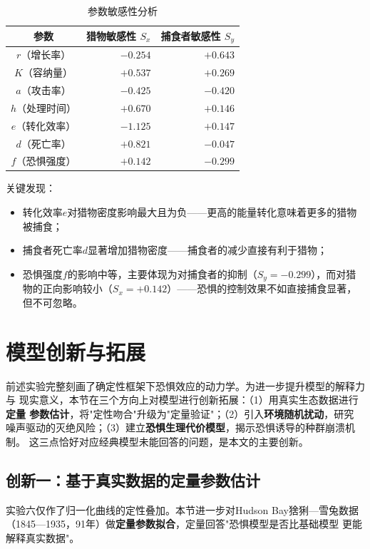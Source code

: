 \documentclass[UTF8]{ctexart}
\begin{document}
\begin{table}[H]
\centering
\caption{参数敏感性分析}
\label{tab:sensitivity}
\begin{tabular}{c|r|r}
\hline
\textbf{参数} & \textbf{猎物敏感性 $S_x$} & \textbf{捕食者敏感性 $S_y$} \\
\hline
$r$（增长率）    & $-0.254$ & $+0.643$ \\
$K$（容纳量）    & $+0.537$ & $+0.269$ \\
$a$（攻击率）    & $-0.425$ & $-0.420$ \\
$h$（处理时间）  & $+0.670$ & $+0.146$ \\
$e$（转化效率）  & $-1.125$ & $+0.147$ \\
$d$（死亡率）    & $+0.821$ & $-0.047$ \\
$f$（恐惧强度）  & $+0.142$ & $-0.299$ \\
\hline
\end{tabular}
\end{table}

关键发现：
\begin{itemize}
    \item 转化效率$e$对猎物密度影响最大且为负——更高的能量转化意味着更多的猎物被捕食；
    \item 捕食者死亡率$d$显著增加猎物密度——捕食者的减少直接有利于猎物；
    \item 恐惧强度$f$的影响中等，主要体现为对捕食者的抑制（$S_y = -0.299$），而对猎物的正向影响较小（$S_x = +0.142$）——恐惧的控制效果不如直接捕食显著，但不可忽略。
\end{itemize}

\section{模型创新与拓展}

前述实验完整刻画了确定性框架下恐惧效应的动力学。为进一步提升模型的解释力与
现实意义，本节在三个方向上对模型进行创新拓展：（1）用真实生态数据进行\textbf{定量
参数估计}，将"定性吻合"升级为"定量验证"；（2）引入\textbf{环境随机扰动}，研究
噪声驱动的灭绝风险；（3）建立\textbf{恐惧生理代价模型}，揭示恐惧诱导的种群崩溃机制。
这三点恰好对应经典模型未能回答的问题，是本文的主要创新。

\subsection{创新一：基于真实数据的定量参数估计}

实验六仅作了归一化曲线的定性叠加。本节进一步对Hudson Bay猞猁—雪兔数据
（1845—1935，91年）做\textbf{定量参数拟合}，定量回答"恐惧模型是否比基础模型
更能解释真实数据"。
\end{document}
